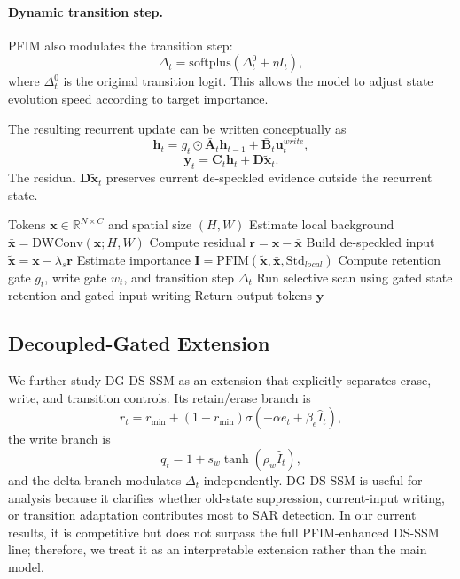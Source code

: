 \documentclass[letterpaper]{article}
\begin{document}
\paragraph{Dynamic transition step.}
PFIM also modulates the transition step:
\begin{equation}
  \Delta_t = \mathrm{softplus}(\Delta^{0}_t + \eta I_t),
\end{equation}
where $\Delta^{0}_t$ is the original transition logit. This allows the model to adjust state evolution speed according to target importance.

The resulting recurrent update can be written conceptually as
\begin{equation}
  \mathbf{h}_t =
  g_t \odot \bar{\mathbf{A}}_t\mathbf{h}_{t-1}
  + \bar{\mathbf{B}}_t\mathbf{u}^{write}_t,
\end{equation}
\begin{equation}
  \mathbf{y}_t = \mathbf{C}_t\mathbf{h}_t + \mathbf{D}\widetilde{\mathbf{x}}_t.
\end{equation}
The residual $\mathbf{D}\widetilde{\mathbf{x}}_t$ preserves current de-speckled evidence outside the recurrent state.

\begin{algorithm}[t]
\caption{IG-DS-SSM Forward Pass}
\begin{algorithmic}[1]
\REQUIRE Tokens $\mathbf{x}\in\mathbb{R}^{N\times C}$ and spatial size $(H,W)$
\STATE Estimate local background $\bar{\mathbf{x}}=\mathrm{DWConv}(\mathbf{x};H,W)$
\STATE Compute residual $\mathbf{r}=\mathbf{x}-\bar{\mathbf{x}}$
\STATE Build de-speckled input $\widetilde{\mathbf{x}}=\mathbf{x}-\lambda_s\mathbf{r}$
\STATE Estimate importance $\mathbf{I}=\mathrm{PFIM}(\widetilde{\mathbf{x}},\bar{\mathbf{x}},\mathrm{Std}_{local})$
\STATE Compute retention gate $g_t$, write gate $w_t$, and transition step $\Delta_t$
\STATE Run selective scan using gated state retention and gated input writing
\STATE Return output tokens $\mathbf{y}$
\end{algorithmic}
\end{algorithm}

\subsection{Decoupled-Gated Extension}

We further study DG-DS-SSM as an extension that explicitly separates erase, write, and transition controls. Its retain/erase branch is
\begin{equation}
  r_t = r_{\min} + (1-r_{\min})\sigma(-\alpha e_t+\beta_e\hat{I}_t),
\end{equation}
the write branch is
\begin{equation}
  q_t = 1+s_w\tanh(\rho_w\hat{I}_t),
\end{equation}
and the delta branch modulates $\Delta_t$ independently. DG-DS-SSM is useful for analysis because it clarifies whether old-state suppression, current-input writing, or transition adaptation contributes most to SAR detection. In our current results, it is competitive but does not surpass the full PFIM-enhanced DS-SSM line; therefore, we treat it as an interpretable extension rather than the main model.
\end{document}
